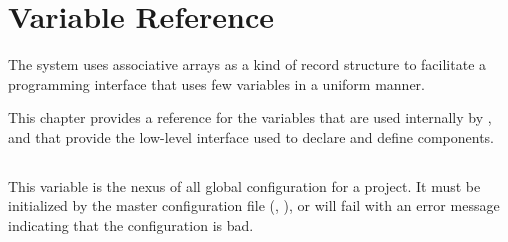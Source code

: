 %
%
%
%
\chapter{Variable Reference}\label{chap:variables}

The \lmsbw system uses associative arrays as a kind of record
structure to facilitate a programming interface that uses few
variables in a uniform manner.

This chapter provides a reference for the variables that are used
internally by \lmsbw, and that provide the low-level interface used to
declare and define components.

\begin{center}\end{center}

\section{\lmsbwconfiguration}\label{variables:lmsbw-configuration}

This variable is the nexus of all global configuration for a project.
It must be initialized by the master configuration file
(, ),
or \lmsbw will fail with an error message indicating that the
configuration is bad.

